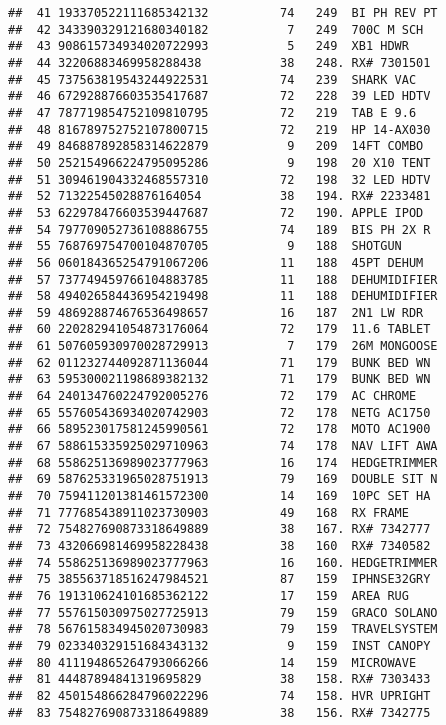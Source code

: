 \documentclass[]{article}
\begin{document}
\begin{verbatim}
##  41 193370522111685342132          74   249  BI PH REV PT
##  42 343390329121680340182           7   249  700C M SCH  
##  43 908615734934020722993           5   249  XB1 HDWR    
##  44 32206883469958288438           38   248. RX# 7301501 
##  45 737563819543244922531          74   239  SHARK VAC   
##  46 672928876603535417687          72   228  39 LED HDTV 
##  47 787719854752109810795          72   219  TAB E 9.6   
##  48 816789752752107800715          72   219  HP 14-AX030 
##  49 846887892858314622879           9   209  14FT COMBO  
##  50 252154966224795095286           9   198  20 X10 TENT 
##  51 309461904332468557310          72   198  32 LED HDTV 
##  52 71322545028876164054           38   194. RX# 2233481 
##  53 622978476603539447687          72   190. APPLE IPOD  
##  54 797709052736108886755          74   189  BIS PH 2X R 
##  55 768769754700104870705           9   188  SHOTGUN     
##  56 060184365254791067206          11   188  45PT DEHUM  
##  57 737749459766104883785          11   188  DEHUMIDIFIER
##  58 494026584436954219498          11   188  DEHUMIDIFIER
##  59 486928874676536498657          16   187  2N1 LW RDR  
##  60 220282941054873176064          72   179  11.6 TABLET 
##  61 507605930970028729913           7   179  26M MONGOOSE
##  62 011232744092871136044          71   179  BUNK BED WN 
##  63 595300021198689382132          71   179  BUNK BED WN 
##  64 240134760224792005276          72   179  AC CHROME   
##  65 557605436934020742903          72   178  NETG AC1750 
##  66 589523017581245990561          72   178  MOTO AC1900 
##  67 588615335925029710963          74   178  NAV LIFT AWA
##  68 558625136989023777963          16   174  HEDGETRIMMER
##  69 587625331965028751913          79   169  DOUBLE SIT N
##  70 759411201381461572300          14   169  10PC SET HA 
##  71 777685438911023730903          49   168  RX FRAME    
##  72 754827690873318649889          38   167. RX# 7342777 
##  73 432066981469958228438          38   160  RX# 7340582 
##  74 558625136989023777963          16   160. HEDGETRIMMER
##  75 385563718516247984521          87   159  IPHNSE32GRY 
##  76 191310624101685362122          17   159  AREA RUG    
##  77 557615030975027725913          79   159  GRACO SOLANO
##  78 567615834945020730983          79   159  TRAVELSYSTEM
##  79 023340329151684343132           9   159  INST CANOPY 
##  80 411194865264793066266          14   159  MICROWAVE   
##  81 44487894841319695829           38   158. RX# 7303433 
##  82 450154866284796022296          74   158. HVR UPRIGHT 
##  83 754827690873318649889          38   156. RX# 7342775 

\end{verbatim}
\end{document}
